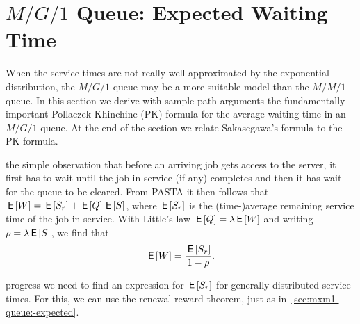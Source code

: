 




\section{$M/G/1$ Queue: Expected Waiting Time}
\label{sec:mg1}


When the service times are not really well approximated by the exponential distribution, the $M/G/1$ queue may be a more suitable model than the $M/M/1$ queue.
In this section we derive with sample path arguments the fundamentally important Pollaczek-Khinchine (PK) formula for the average waiting time in an $M/G/1$ queue.
At the  end of the section we relate Sakasegawa's formula to the PK formula.


 the simple observation that before an arriving job gets access to the server, it first has to wait until the job in service (if any) completes and then it has wait for the queue to be cleared.
From PASTA it then follows  that
$\,\mathsf{E}\left[W\right] = \,\mathsf{E}\left[S_r\right] + \,\mathsf{E}\left[Q\right] \,\mathsf{E}\left[S\right]$, where  $\,\mathsf{E}\left[S_r\right]$ is the (time-)average remaining service time of the job in service. With Little's law $\,\mathsf{E}\left[Q\right] = \lambda \,\mathsf{E}\left[W\right]$ and writing $\rho = \lambda \,\mathsf{E}\left[S\right]$, we  find that
\begin{equation*}
 \,\mathsf{E}\left[W\right] = \frac{\,\mathsf{E}\left[S_r\right]}{1-\rho}.
\end{equation*}

 progress we need to find an expression for $\,\mathsf{E}\left[S_r\right]$ for generally distributed service times.
For this, we can use the renewal reward theorem, just as in~\cref{sec:mxm1-queue:-expected}.

